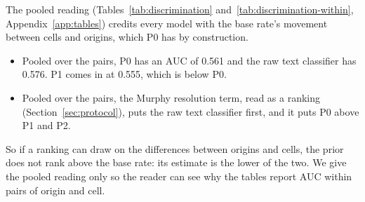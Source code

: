 \begin{table}[t]\centering\scriptsize
\caption{The main run, with exposure fixed at the cell median over the rows visible at each origin, against the realized-traffic diagnostic, headline archive. The first AUC column treats forecasts that are equal to nine decimals as tied; the second is the run's AUC within pairs, with its interval. The last column gives the count of pairs of origin and cell in which the rung issues one forecast. A rung that gives one forecast in every pair has an AUC within pairs of one half: the second column then says so and prints no interval, and the lower panel prints one half.}
\label{tab:fmt-exposure-fixed}

\end{table}

The pooled reading (Tables~\ref{tab:discrimination} and~\ref{tab:discrimination-within}, Appendix~\ref{app:tables}) credits every model with the base rate's movement between cells and origins, which P0 has by construction.
\begin{itemize}
\item Pooled over the pairs, P0 has an AUC of 0.561 and the raw text classifier has 0.576. P1 comes in at 0.555, which is below P0.
\item Pooled over the pairs, the Murphy resolution term, read as a ranking (Section~\ref{sec:protocol}), puts the raw text classifier first, and it puts P0 above P1 and P2.
\end{itemize}
So if a ranking can draw on the differences between origins and cells, the prior does not rank above the base rate: its estimate is the lower of the two. We give the pooled reading only so the reader can see why the tables report AUC within pairs of origin and cell.

